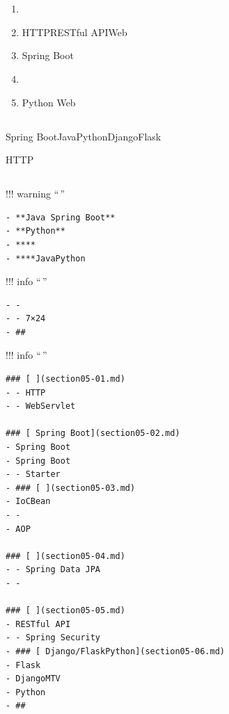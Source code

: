 \section{}\label{section}

\subsection{}\label{section-1}

\begin{enumerate}
\def\labelenumi{\arabic{enumi}.}
\tightlist
\item
\item
  HTTPRESTful APIWeb
\item
  Spring Boot
\item
\item
  Python Web
\end{enumerate}

\subsection{}\label{section-2}

Spring BootJavaPythonDjangoFlask

HTTP

\subsection{}\label{section-3}

!!! warning ``\,''

\begin{verbatim}
- **Java Spring Boot**
- **Python**
- ****
- ****JavaPython
\end{verbatim}

!!! info ``\,''

\begin{verbatim}
- - 
- - 7×24
- ## 
\end{verbatim}

!!! info ``\,''

\begin{verbatim}
### [ ](section05-01.md)
- - HTTP
- - WebServlet

### [ Spring Boot](section05-02.md)
- Spring Boot
- Spring Boot
- - Starter
- ### [ ](section05-03.md)
- IoCBean
- - 
- AOP

### [ ](section05-04.md)
- - Spring Data JPA
- - 

### [ ](section05-05.md)
- RESTful API
- - Spring Security
- ### [ Django/FlaskPython](section05-06.md)
- Flask
- DjangoMTV
- Python
- ## 
\end{verbatim}

